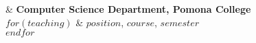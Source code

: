      & \textbf{Computer Science Department, Pomona College} \\
$for(teaching)$
     & $position$, $course$, $semester$ \\
$endfor$
